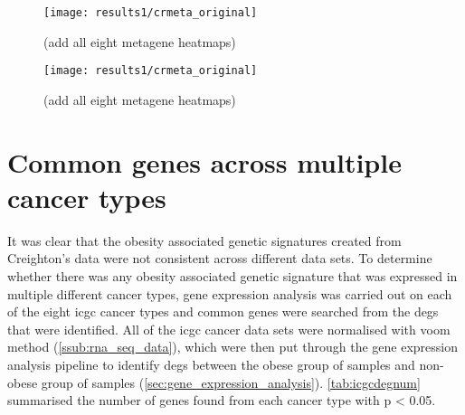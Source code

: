 \begin{figure}[htp!]
	\centering
	\texttt{[image: results1/crmeta\_original]}
	\caption[Novel obesity associated metagenes in Print's data]{(add all eight metagene heatmaps)}
	\label{fig:degmetaprint}
\end{figure}

\begin{figure}[htp!]
	\centering
	\texttt{[image: results1/crmeta\_original]}
	\caption[Novel obesity associated metagenes in Print's data]{(add all eight metagene heatmaps)}
	\label{fig:degmetaprintbmi}
\end{figure}


\section{Common genes across multiple cancer types}
\label{sec:common_genes_across_multiple_cancer_types}

It was clear that the obesity associated genetic signatures created from Creighton's data were not consistent across different data sets.
To determine whether there was any obesity associated genetic signature that was expressed in multiple different cancer types, gene expression analysis was carried out on each of the eight \gls{icgc} cancer types and common genes were searched from the \glspl{deg} that were identified.
All of the \gls{icgc} cancer data sets were normalised with voom method (\cref{ssub:rna_seq_data}), which were then put through the gene expression analysis pipeline to identify \glspl{deg} between the obese group of samples and non-obese group of samples (\cref{sec:gene_expression_analysis}).
\cref{tab:icgcdegnum} summarised the number of genes found from each cancer type with p \textless{} 0.05.


